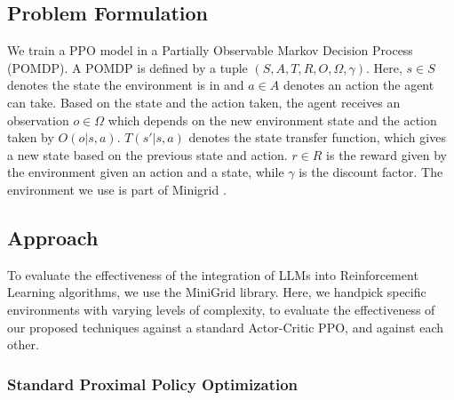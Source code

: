 \documentclass[conference]{IEEEtran}
\begin{document}
\subsection{Problem Formulation}

We train a PPO model in a Partially Observable Markov Decision Process (POMDP). A POMDP is defined by a tuple $(S, A, T, R, O, \Omega, \gamma)$. Here, $s \in S$ denotes the state the environment is in and $a \in A$ denotes an action the agent can take. Based on the state and the action taken, the agent receives an observation $o \in \Omega$ which depends on the new environment state and the action taken by $O(o | s, a)$. $T(s' | s, a)$ denotes the state transfer function, which gives a new state based on the previous state and action. $r \in R$ is the reward given by the environment given an action and a state, while $\gamma$ is the discount factor.  The environment we use is part of Minigrid \cite{minigrid}. 

\subsection{Approach}

To evaluate the effectiveness of the integration of LLMs into Reinforcement Learning algorithms, we use the MiniGrid library. Here, we handpick specific environments with varying levels of complexity, to evaluate the effectiveness of our proposed techniques against a standard Actor-Critic PPO, and against each other. %


\subsubsection{Standard Proximal Policy Optimization}
\end{document}
